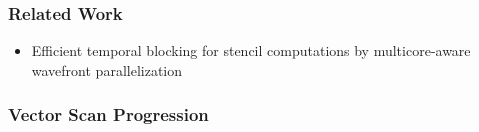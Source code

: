 \documentclass[draft]{beamer}
\begin{document}
  \begin{frame}
    \frametitle{Related Work}
    \begin{itemize}
      \item{Efficient temporal blocking for stencil computations by multicore-aware wavefront
      parallelization}
    \end{itemize}
  \end{frame}


  \begin{frame}
    \frametitle{Vector Scan Progression}
    \begin{figure}
      \centering
      
    \end{figure}
  \end{frame}
\end{document}
